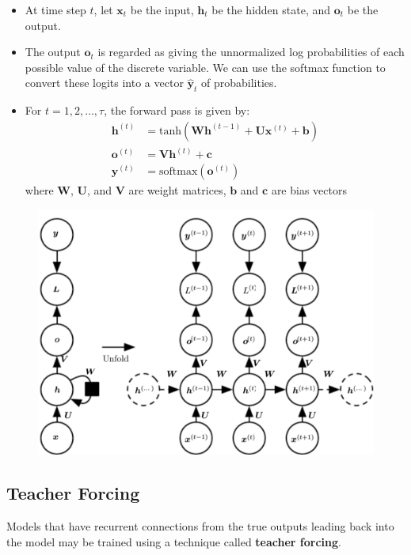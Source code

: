 \begin{itemize}
  \item At time step $t$, let $\mathbf{x}_t$ be the input, $\mathbf{h}_t$ be the hidden state, and $\mathbf{o}_t$ be the output.
  \item The output $\mathbf{o}_t$ is regarded as giving the unnormalized log probabilities of each possible value of the discrete variable. We can use the softmax function to convert these logits into a vector $\hat{\mathbf{y}}_t$ of probabilities.
  \item For $t = 1, 2, \ldots, \tau$, the forward pass is given by:
    \begin{align*}
      \mathbf{h}^{(t)} &= \text{tanh}(\mathbf{W} \mathbf{h}^{(t-1)} + \mathbf{U} \mathbf{x}^{(t)} + \mathbf{b}) \\
      \mathbf{o}^{(t)} &= \mathbf{V} \mathbf{h}^{(t)} + \mathbf{c} \\
      \mathbf{y}^{(t)} &= \text{softmax}(\mathbf{o}^{(t)})
    \end{align*}
    where $\mathbf{W}$, $\mathbf{U}$, and $\mathbf{V}$ are weight matrices, $\mathbf{b}$ and $\mathbf{c}$ are bias vectors
\end{itemize}

\begin{figure}[H]
  \centering
  \includegraphics[width=0.8\linewidth]{images/rnn.png}
\end{figure}

\subsection*{Teacher Forcing}

Models that have recurrent connections from the true outputs leading back into the model may be trained using a technique called \textbf{teacher forcing}.

